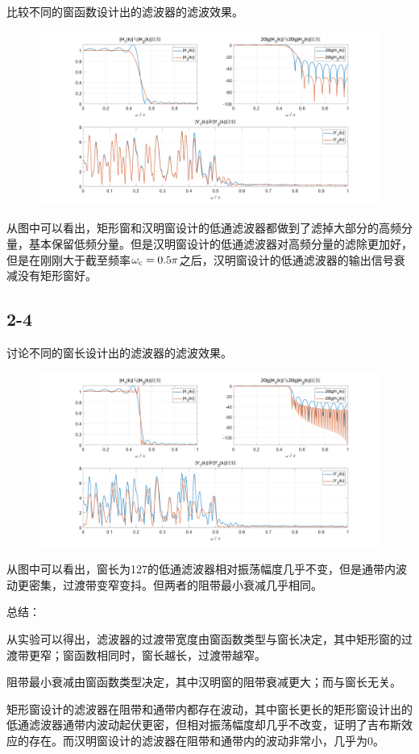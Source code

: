 \documentclass{../source/Experiment}
\begin{document}
            比较不同的窗函数设计出的滤波器的滤波效果。
            \begin{figure}[H]
                \centering
                \includegraphics[width = 1\textwidth]{src/exp4-2-3-2.png}
            \end{figure}
            从图中可以看出，矩形窗和汉明窗设计的低通滤波器都做到了滤掉大部分的高频分量，基本保留低频分量。但是汉明窗设计的低通滤波器对高频分量的滤除更加好，但是在刚刚大于截至频率$\rm \omega _c = 0.5 \pi$之后，汉明窗设计的低通滤波器的输出信号衰减没有矩形窗好。
            
        \subsection{2-4}
            讨论不同的窗长设计出的滤波器的滤波效果。
            \begin{figure}[H]
                \centering
                \includegraphics[width = 1\textwidth]{src/exp4-2-4.png}
            \end{figure}
            从图中可以看出，窗长为127的低通滤波器相对振荡幅度几乎不变，但是通带内波动更密集，过渡带变窄变抖。但两者的阻带最小衰减几乎相同。

        总结：
        
        从实验可以得出，滤波器的过渡带宽度由窗函数类型与窗长决定，其中矩形窗的过渡带更窄；窗函数相同时，窗长越长，过渡带越窄。

        阻带最小衰减由窗函数类型决定，其中汉明窗的阻带衰减更大；而与窗长无关。

        矩形窗设计的滤波器在阻带和通带内都存在波动，其中窗长更长的矩形窗设计出的低通滤波器通带内波动起伏更密，但相对振荡幅度却几乎不改变，证明了吉布斯效应的存在。而汉明窗设计的滤波器在阻带和通带内的波动非常小，几乎为0。
        
\end{document}
